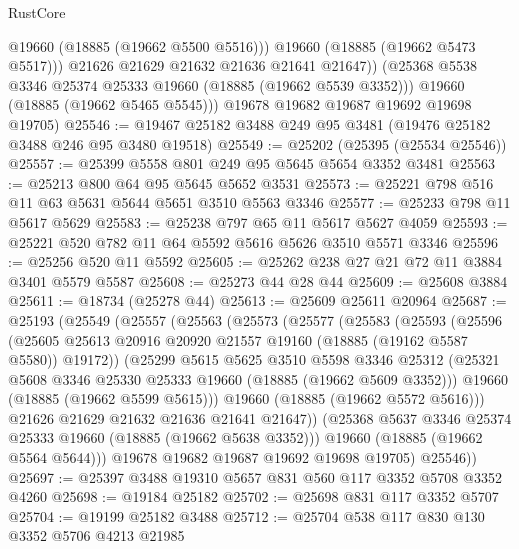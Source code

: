 \begin{lexlean}{RustCore}
\begin{coremodule}
                @19660
                (@18885 (@19662 @5500 @5516)))
              @19660
              (@18885 (@19662 @5473 @5517)))
            @21626
            @21629
            @21632
            @21636
            @21641
            @21647))
        (@25368 @5538 @3346 @25374 @25333 @19660 (@18885 (@19662 @5539 @3352)))
        @19660
        (@18885 (@19662 @5465 @5545)))
      @19678
      @19682
      @19687
      @19692
      @19698
      @19705)
@25546 := @19467 @25182 @3488 @249 @95 @3481 (@19476 @25182 @3488 @246 @95 @3480 @19518)
@25549 := @25202 (@25395 (@25534 @25546))
@25557 := @25399 @5558 @801 @249 @95 @5645 @5654 @3352 @3481
@25563 := @25213 @800 @64 @95 @5645 @5652 @3531
@25573 := @25221 @798 @516 @11 @63 @5631 @5644 @5651 @3510 @5563 @3346
@25577 := @25233 @798 @11 @5617 @5629
@25583 := @25238 @797 @65 @11 @5617 @5627 @4059
@25593 := @25221 @520 @782 @11 @64 @5592 @5616 @5626 @3510 @5571 @3346
@25596 := @25256 @520 @11 @5592
@25605 := @25262 @238 @27 @21 @72 @11 @3884 @3401 @5579 @5587
@25608 := @25273 @44 @28 @44
@25609 := @25608 @3884
@25611 := @18734 (@25278 @44)
@25613 := @25609 @25611 @20964
@25687 := @25193
    (@25549
      (@25557
        (@25563
          (@25573
            (@25577
              (@25583
                (@25593
                  (@25596
                    (@25605
                      @25613
                      @20916
                      @20920
                      @21557
                      @19160
                      (@18885 (@19162 @5587 @5580))
                      @19172))
                  (@25299
                    @5615
                    @5625
                    @3510
                    @5598
                    @3346
                    @25312
                    (@25321 @5608 @3346 @25330 @25333 @19660 (@18885 (@19662 @5609 @3352)))
                    @19660
                    (@18885 (@19662 @5599 @5615)))
                  @19660
                  (@18885 (@19662 @5572 @5616)))
                @21626
                @21629
                @21632
                @21636
                @21641
                @21647))
            (@25368 @5637 @3346 @25374 @25333 @19660 (@18885 (@19662 @5638 @3352)))
            @19660
            (@18885 (@19662 @5564 @5644)))
          @19678
          @19682
          @19687
          @19692
          @19698
          @19705)
        @25546))
@25697 := @25397 @3488 @19310 @5657 @831 @560 @117 @3352 @5708 @3352 @4260
@25698 := @19184 @25182
@25702 := @25698 @831 @117 @3352 @5707
@25704 := @19199 @25182 @3488
@25712 := @25704 @538 @117 @830 @130 @3352 @5706 @4213 @21985

\end{coremodule}
\end{lexlean}
